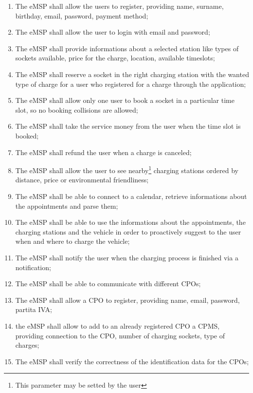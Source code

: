 \begin{enumerate}[label=\textbf{R\arabic*}]
    \item The \ac{eMSP} shall allow the users to register, providing name, surname, birthday, email, password, payment method;
    \item The \ac{eMSP} shall allow the user to login with email and password;
    \item The \ac{eMSP} shall provide informations about a selected station like types of sockets available, price for the charge, location, available timeslots;
    \item The \ac{eMSP} shall reserve a socket in the right charging station with the wanted type of charge for a user who registered for a charge through the application;
    \item The \ac{eMSP} shall allow only one user to book a socket in a particular time slot, so no booking collisions are allowed;
    \item The \ac{eMSP} shall take the service money from the user when the time slot is booked;
    \item The \ac{eMSP} shall refund the user when a charge is canceled;
    \item The \ac{eMSP} shall allow the user to see nearby\footnote{This parameter may be setted by the user} charging stations ordered by distance, price or environmental friendliness;
    \item The \ac{eMSP} shall be able to connect to a calendar, retrieve informations about the appointments and parse them;
    \item The \ac{eMSP} shall be able to use the informations about the appointments, the charging stations and the vehicle in order to proactively suggest to the user when and where to charge the vehicle;
    \item The \ac{eMSP} shall notify the user when the charging process is finished via a notification;
    \item The \ac{eMSP} shall be able to communicate with different \acp{CPO};
    \item The \ac{eMSP} shall allow a \ac{CPO} to register, providing name, email, password, \gls{partita IVA};
    \item the \ac{eMSP} shall allow to add to an already registered \ac{CPO} a \ac{CPMS}, providing connection to the \ac{CPO}, number of charging sockets, type of charges;
    \item The \ac{eMSP} shall verify the correctness of the identification data for the \acp{CPO};

\end{enumerate}
